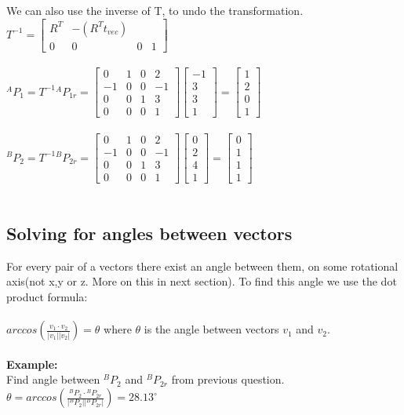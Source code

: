 \documentclass{article}
\begin{document}
We can also use the inverse of T, to undo the transformation.\\
$T^{-1}=\begin{bmatrix}
R^T & -(R^Tt_{vec})\\
0 & 0 & 0 & 1
\end{bmatrix}$\\\\
${}^{A}P_{1}= T^{-1}{}^{A}P_{1r}=\begin{bmatrix}
0 & 1 & 0 & 2\\
-1 & 0 & 0 & -1\\
0 & 0 & 1 &  3\\
0 & 0 & 0 & 1
\end{bmatrix}\begin{bmatrix}
-1  \\
3  \\
3  \\
1
\end{bmatrix}=\begin{bmatrix}
1  \\
2  \\
0  \\
1
\end{bmatrix}$\\\\
${}^{B}P_{2}= T^{-1}{}^{B}P_{2r}=\begin{bmatrix}
0 & 1 & 0 & 2\\
-1 & 0 & 0 & -1\\
0 & 0 & 1 &  3\\
0 & 0 & 0 & 1
\end{bmatrix}\begin{bmatrix}
0  \\
2  \\
4  \\
1
\end{bmatrix}=\begin{bmatrix}
0  \\
1  \\
1  \\
1
\end{bmatrix}$\\\\

\subsection{Solving for angles between vectors}
For every pair of a vectors there exist an angle between them, on some rotational axis(not x,y or z. More on this in next section). To find this angle we use the dot product formula:\\\\
$arccos(\frac{v_1 \cdot v_2}{|v_1||v_2|})=\theta$ where $\theta$ is the angle between vectors $v_1$ and $v_2$.\\\\
\textbf{Example:}\\
Find angle between $^BP_2$ and $^BP_{2r}$ from previous question.\\
$\theta=arccos(\frac{^BP_2 \cdot {}^BP_{2r}}{|{}^BP_2||{}^BP_{2r}|})=28.13^\circ$ 
\end{document}
